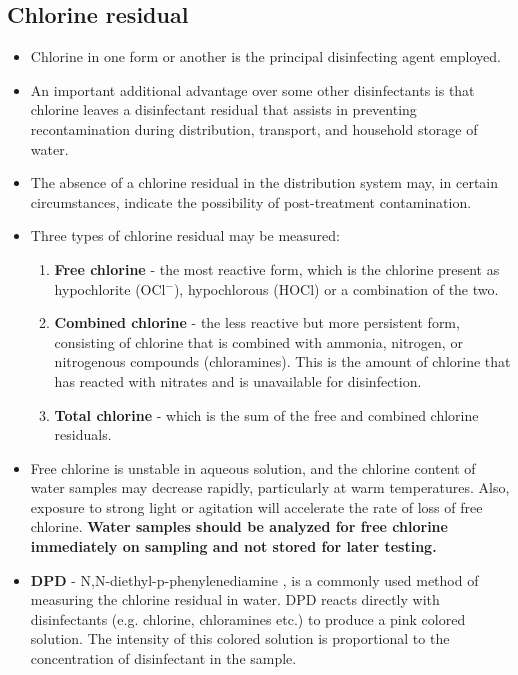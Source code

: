\subsection{Chlorine residual}
\begin{itemize}
\item  Chlorine in one form or another is the principal disinfecting agent employed. 
\item An important additional advantage over some other disinfectants is that chlorine leaves a disinfectant residual that assists in preventing recontamination during distribution, transport, and household storage of water. 
\item The absence of a chlorine residual in the distribution system may, in certain circumstances, indicate the possibility of post-treatment contamination.
\item Three types of chlorine residual may be measured: 
\begin{enumerate}
\item \textbf{Free chlorine}  - the most reactive form, which is the chlorine present as hypochlorite (OCl$^-$), hypochlorous (HOCl) or a combination of the two.  
\item \textbf{Combined chlorine} - the less reactive but more persistent form, consisting of chlorine that is combined with ammonia, nitrogen, or nitrogenous compounds (chloramines). This is the amount of chlorine that has reacted with nitrates and is unavailable for disinfection. 
\item \textbf{Total chlorine} - which is the sum of the free and combined chlorine residuals.
\end{enumerate}
\item Free chlorine is unstable in aqueous solution, and the chlorine content of water samples may decrease rapidly, particularly at warm temperatures. Also, exposure to strong light or agitation will accelerate the rate of loss of free chlorine. \textbf{Water samples should be analyzed for free chlorine immediately on sampling and not stored for later testing.}
\item \textbf{DPD} - N,N-diethyl-p-phenylenediamine , is a commonly used method of measuring the chlorine residual in water. DPD reacts directly with disinfectants (e.g. chlorine, chloramines etc.) to produce a pink colored solution. The intensity of this colored solution is proportional to the concentration of disinfectant in the sample.

\end{itemize}
